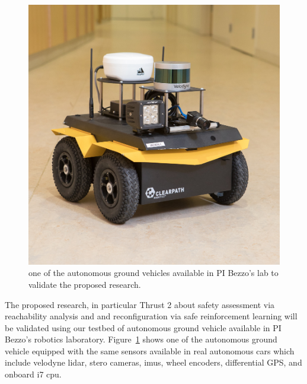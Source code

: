 \begin{figure}
\vspace{-5pt}
\centering
\includegraphics[width = \linewidth ]{figures/jackal_2.jpg} 
\caption{one of the autonomous ground vehicles available in PI Bezzo's lab to validate the proposed research.}
\vspace{-5pt}
\label{fig:jackal}\end{figure}
The proposed research, in particular Thrust 2 about safety assessment via reachability analysis and and reconfiguration via safe reinforcement learning will be validated using our testbed of autonomous ground vehicle available in PI Bezzo's robotics laboratory. Figure~\ref{fig:jackal} shows one of the autonomous ground vehicle equipped with the same sensors available in real autonomous cars which include velodyne lidar, stero cameras, imus, wheel encoders, differential GPS, and onboard i7 cpu.



